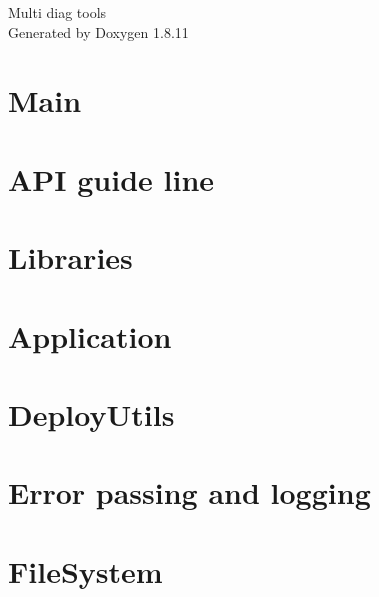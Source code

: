 \documentclass[twoside]{book}
\newcommand{\+}{\discretionary{\mbox{\scriptsize$\hookleftarrow$}}{}{}}
\newcommand{\clearemptydoublepage}{%
  \newpage{\pagestyle{empty}\cleardoublepage}%
}
\begin{document}
\hypersetup{pageanchor=false,
             bookmarksnumbered=true,
             pdfencoding=unicode
            }
\begin{titlepage}
\vspace*{7cm}
\begin{center}%
{\Large Multi diag tools }\\
\vspace*{1cm}
{\large Generated by Doxygen 1.8.11}\\
\end{center}
\end{titlepage}
\clearemptydoublepage
\tableofcontents
\clearemptydoublepage
{}
\hypersetup{pageanchor=true}

\chapter{Main}
\label{index}\hypertarget{index}{}
\chapter{A\+PI guide line}
\label{guideline_page}
\hypertarget{guideline_page}{}

\chapter{Libraries}
\label{libraries_page}
\hypertarget{libraries_page}{}

\chapter{Application}
\label{libs_Application}
\hypertarget{libs_Application}{}

\chapter{Deploy\+Utils}
\label{libs_DeployUtils}
\hypertarget{libs_DeployUtils}{}

\chapter{Error passing and logging}
\label{libs_Error}
\hypertarget{libs_Error}{}

\chapter{File\+System}
\label{libs_FileSystem}
\hypertarget{libs_FileSystem}{}

\end{document}
